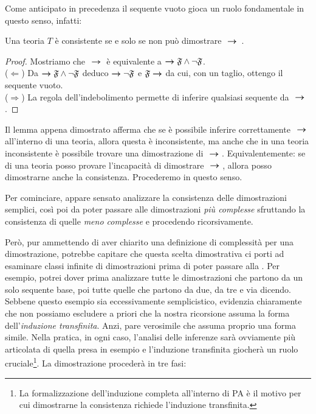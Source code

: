 		Come anticipato in precedenza il sequente vuoto gioca un ruolo fondamentale in questo senso, infatti:
	\begin{lemma}
		Una teoria $T$ è consistente se e solo se non può dimostrare $\ \bm{\rightarrow} \; \,$.
	\end{lemma}
	\begin{proof}
		Mostriamo che $\ \bm{\rightarrow} \; $ è equivalente a $\bm{\rightarrow} \mathfrak{F}\land \neg\mathfrak{F}$.\\
		($\Leftarrow$) Da $\bm{\rightarrow} \mathfrak{F}\land \neg\mathfrak{F}$ deduco $\bm{\rightarrow} \neg\mathfrak{F}$ e $\mathfrak{F}\bm{\rightarrow}$ da cui, con un taglio, ottengo il sequente vuoto.\\
		($\Rightarrow$) La regola dell'indebolimento permette di inferire qualsiasi sequente da $\ \bm{\rightarrow} \; $.
		\qedhere
	\end{proof}	
		Il lemma appena dimostrato afferma che se è possibile inferire correttamente $\ \bm{\rightarrow} \; $ all'interno di una teoria, allora questa è inconsistente, ma anche che in una teoria inconsistente è possibile trovare una dimostrazione di $\ \bm{\rightarrow} \; $. Equivalentemente: se di una teoria posso provare l'incapacità di dimostrare $\ \bm{\rightarrow} \; $, allora posso dimostrarne anche la consistenza. Procederemo in questo senso.
		
		Per cominciare, appare sensato analizzare la consistenza delle dimostrazioni semplici, così poi da poter passare alle dimostrazioni \emph{più complesse} sfruttando la consistenza di quelle \emph{meno complesse} e procedendo ricorsivamente.
		
		Però, pur ammettendo di aver chiarito una definizione di complessità per una dimostrazione, potrebbe capitare che questa scelta dimostrativa ci porti ad esaminare classi infinite di dimostrazioni prima di poter passare alla . Per esempio, potrei dover prima analizzare tutte le dimostrazioni che partono da un solo sequente base, poi tutte quelle che partono da due, da tre e via dicendo. Sebbene questo esempio sia eccessivamente semplicistico, evidenzia chiaramente che non possiamo escludere a priori che la nostra ricorsione assuma la forma dell'\emph{induzione transfinita}. Anzi, pare verosimile che assuma proprio una forma simile. Nella pratica, in ogni caso, l'analisi delle inferenze sarà ovviamente più articolata di quella presa in esempio e l'induzione transfinita giocherà un ruolo cruciale\footnote{La formalizzazione dell'induzione completa all'interno di PA è il motivo per cui dimostrarne la consistenza richiede l'induzione transfinita.}. La dimostrazione procederà in tre fasi:
		
